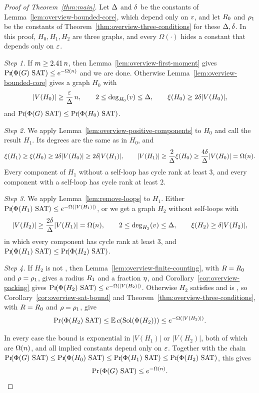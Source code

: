 \begin{proof}[Proof of Theorem~\ref{thm:main}]
Let \(\Delta\) and \(\delta\) be the constants of
Lemma~\ref{lem:overview-bounded-core}, which depend only on \(\varepsilon\), and
let \(R_0\) and \(\rho_1\) be the constants of
Theorem~\ref{thm:overview-three-conditions} for these \(\Delta,\delta\). In this
proof, \(H_0,H_1,H_2\) are three graphs, and every \(\Omega(\cdot)\) hides a
constant that depends only on \(\varepsilon\).

\emph{Step 1.} If \(m\ge2.41\,n\), then
Lemma~\ref{lem:overview-first-moment} gives
\(\Prx{\rform{\Gin}\SAT}\le e^{-\Omega(\nvert)}\) and we are done. Otherwise
Lemma~\ref{lem:overview-bounded-core} gives a graph \(H_0\) with
\[
  |V(H_0)|\ge\frac{\varepsilon}{\Delta}\,n,
  \qquad
  2\le\deg_{H_0}(v)\le\Delta,
  \qquad
  \xi(H_0)\ge2\delta|V(H_0)|,
\]
and \(\Prx{\rform{\Gin}\SAT}\le\Prx{\rform{H_0}\SAT}\).

\emph{Step 2.} We apply Lemma~\ref{lem:overview-positive-components} to
\(H_0\) and call the result \(H_1\). Its degrees are the same as in \(H_0\), and
\[
  \xi(H_1)\ge\xi(H_0)\ge2\delta|V(H_0)|\ge2\delta|V(H_1)|,
  \qquad
  |V(H_1)|\ge\frac2{\Delta}\xi(H_0)\ge\frac{4\delta}{\Delta}|V(H_0)|=\Omega(n) .
\]
Every component of \(H_1\) without a self-loop has cycle rank at least \(3\),
and every component with a self-loop has cycle rank at least \(2\).

\emph{Step 3.} We apply Lemma~\ref{lem:remove-loops} to \(H_1\). Either
\(\Prx{\rform{H_1}\SAT}\le e^{-\Omega(|V(H_1)|)}\), or we get a graph \(H_2\)
without self-loops with
\[
  |V(H_2)|\ge\frac{2\delta}{\Delta}|V(H_1)|=\Omega(n),
  \qquad
  2\le\deg_{H_2}(v)\le\Delta,
  \qquad
  \xi(H_2)\ge\delta|V(H_2)|,
\]
in which every component has cycle rank at least \(3\), and
\(\Prx{\rform{H_1}\SAT}\le\Prx{\rform{H_2}\SAT}\).

\emph{Step 4.} If \(H_2\) is not \loctree{\radz}{\nontreeo}, then
Lemma~\ref{lem:overview-finite-counting}, with \(R=R_0\) and
\(\rho=\rho_1\), gives a radius \(R_1\) and a fraction \(\eta\), and
Corollary~\ref{cor:overview-packing} gives
\(\Prx{\rform{H_2}\SAT}\le e^{-\Omega(|V(H_2)|)}\). Otherwise \(H_2\) satisfies
\Hyp{} and is \loctree{\radz}{\nontreeo}, so
Corollary~\ref{cor:overview-sat-bound} and
Theorem~\ref{thm:overview-three-conditions}, with \(R=R_0\) and
\(\rho=\rho_1\), give
\[
  \Prx{\rform{H_2}\SAT}
  \le \E\,\solcomp{\rform{H_2}}
  \le e^{-\Omega(|V(H_2)|)} .
\]

In every case the bound is exponential in \(|V(H_1)|\) or \(|V(H_2)|\), both of
which are \(\Omega(n)\), and all implied constants depend only on
\(\varepsilon\). Together with the chain
\(\Prx{\rform{\Gin}\SAT}\le\Prx{\rform{H_0}\SAT}\le\Prx{\rform{H_1}\SAT}
\le\Prx{\rform{H_2}\SAT}\), this gives
\[
  \Prx{\rform{\Gin}\SAT}\le e^{-\Omega(\nvert)} .
\]
\end{proof}
